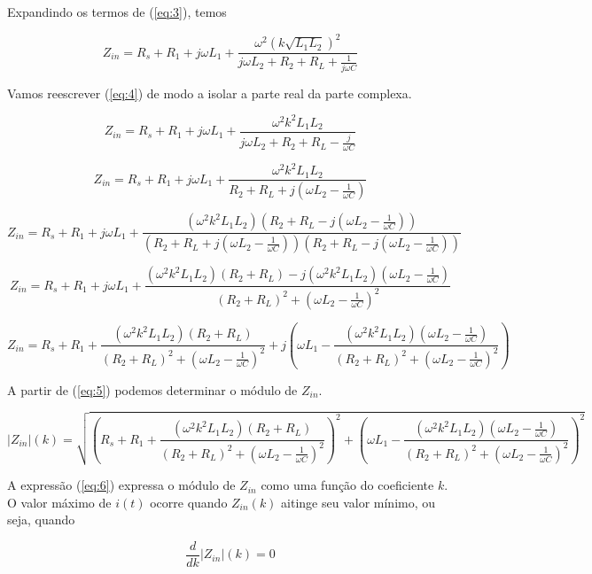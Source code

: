 \documentclass[12pt]{scrartcl}
\begin{document}
    Expandindo os termos de (\ref{eq:3}), temos

    \begin{equation}\label{eq:4}
        Z_{in} = R_s + R_1 + j \omega L_1 + \frac{\omega^2(k\sqrt{L_1L_2})^2}{j\omega L_2 + R_2 + R_L + \frac{1}{j\omega C}}
    \end{equation}

    Vamos reescrever (\ref{eq:4}) de modo a isolar a parte real da parte complexa.

    \[ Z_{in} = R_s + R_1 + j \omega L_1 + \frac{\omega^2k^2L_1L_2}{j\omega L_2 + R_2 + R_L - \frac{j}{\omega C}} \]

    \[ Z_{in} = R_s + R_1 + j \omega L_1 + \frac{\omega^2k^2L_1L_2}{R_2 + R_L + j(\omega L_2 - \frac{1}{\omega C})} \]

    \[ Z_{in} = R_s + R_1 + j \omega L_1 + \frac{(\omega^2k^2L_1L_2)(R_2 + R_L - j(\omega L_2 - \frac{1}{\omega C}))}{(R_2 + R_L + j(\omega L_2 - \frac{1}{\omega C}))(R_2 + R_L - j(\omega L_2 - \frac{1}{\omega C}))} \]

    \[ Z_{in} = R_s + R_1 + j \omega L_1 + \frac{(\omega^2k^2L_1L_2)(R_2 + R_L) - j(\omega^2k^2L_1L_2)(\omega L_2 - \frac{1}{\omega C})}{(R_2 + R_L)^2 + (\omega L_2 - \frac{1}{\omega C})^2} \]

    \begin{equation}\label{eq:5}
        Z_{in} = R_s + R_1 + \frac{(\omega^2k^2L_1L_2)(R_2 + R_L)}{(R_2 + R_L)^2 + (\omega L_2 - \frac{1}{\omega C})^2} + j \left(\omega L_1 - \frac{(\omega^2k^2L_1L_2)(\omega L_2 - \frac{1}{\omega C})}{(R_2 + R_L)^2 + (\omega L_2 - \frac{1}{\omega C})^2}\right)
    \end{equation}

    A partir de (\ref{eq:5}) podemos determinar o módulo de \(Z_{in}\).

    \begin{equation}\label{eq:6}
        |Z_{in}|(k) = \sqrt{\left(R_s + R_1 + \frac{(\omega^2k^2L_1L_2)(R_2 + R_L)}{(R_2 + R_L)^2 + (\omega L_2 - \frac{1}{\omega C})^2}\right)^2 + \left(\omega L_1 - \frac{(\omega^2k^2L_1L_2)(\omega L_2 - \frac{1}{\omega C})}{(R_2 + R_L)^2 + (\omega L_2 - \frac{1}{\omega C})^2}\right)^2}
    \end{equation}

    A expressão (\ref{eq:6}) expressa o módulo de \(Z_{in}\) como uma função do coeficiente \(k\). O valor máximo de \(i(t)\) ocorre quando \(Z_{in}(k)\) aitinge seu valor mínimo, ou seja, quando

    \begin{equation}\label{eq:7}
        \frac{d}{dk}|Z_{in}|(k) = 0
    \end{equation}
\end{document}
